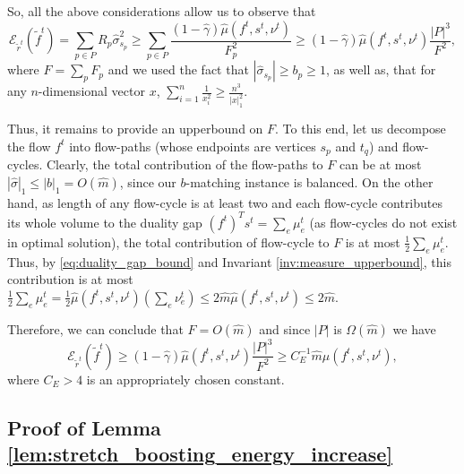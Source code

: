 \documentclass[11pt, letterpaper]{article}
\newcommand{\cenergy}{C_{E}}
\newcommand{\onorm}[1]{|#1|_{1}}
\newcommand{\hm}{\widehat{m}}
\newcommand{\energy}[2]{\mathcal{E}_{#1}(#2)}
\newcommand{\hmu}{\hat{\mu}}
\newcommand{\hgamma}{\hat{\gamma}}
\newcommand{\hsigma}{\hat{\sigma}}
\newcommand{\vnu}{\boldsymbol{\mathit{\nu}}}
\newcommand{\hvsigma}{\boldsymbol{\mathit{\hat{\sigma}}}}
\newcommand{\bb}{\boldsymbol{\mathit{b}}}
\newcommand{\ff}{\boldsymbol{\mathit{f}}}
\newcommand{\tff}{\boldsymbol{\mathit{\tilde{f}}}}
\newcommand{\trr}{\boldsymbol{\mathit{\tilde{r}}}}
\renewcommand{\ss}{\boldsymbol{\mathit{s}}}
\newcommand{\xx}{\boldsymbol{\mathit{x}}}
\begin{document}
So, all the above considerations allow us to observe that
\[
\energy{\trr^t}{\tff^t}= \sum_{p\in P} R_p \hsigma_{s_p}^2 \geq \sum_{p\in P} \frac{(1-\hgamma)\hmu(\ff^t,\ss^t,\vnu^t)}{F_p^2} \geq  (1-\hgamma)\hmu(\ff^t,\ss^t,\vnu^t) \frac{|P|^3}{F^2}, 
\]
where $F=\sum_p F_p$ and we used the fact that $|\hsigma_{s_p}|\geq b_p\geq 1$, as well as, that for any $n$-dimensional vector $\xx$, $\sum_{i=1}^n \frac{1}{x_i^2}\geq \frac{n^3}{\onorm{\xx}^2}$. 

Thus, it remains to provide an upperbound on $F$. To this end, let us decompose the flow $\ff^t$ into flow-paths (whose endpoints are vertices $s_p$ and $t_q$) and flow-cycles. Clearly, the total contribution of the flow-paths to $F$ can be at most $\onorm{\hvsigma}\leq \onorm{\bb}=O(\hm)$, since our $\bb$-matching instance is balanced. On the other hand, as length of any flow-cycle is at least two and each flow-cycle contributes its whole volume to the duality gap $(\ff^t)^T\ss^t=\sum_e \mu_e^t$ (as flow-cycles do not exist in optimal solution), the total contribution of flow-cycle to $F$ is at most $\frac{1}{2}\sum_e \mu_e^t$. Thus, by \eqref{eq:duality_gap_bound} and Invariant \ref{inv:measure_upperbound}, this contribution is at most $\frac{1}{2}\sum_e \mu_e^t=\frac{1}{2}\hmu(\ff^t,\ss^t,\vnu^t)(\sum_e \nu_e^t) \leq  2\hm \hmu(\ff^t,\ss^t,\vnu^t)\leq 2\hm$. 

Therefore, we can conclude that $F= O(\hm)$ and since $|P|$ is $\Omega(\hm)$ we have
\[
\energy{\trr^t}{\tff^t} \geq  (1-\hgamma)\hmu(\ff^t,\ss^t,\vnu^t) \frac{|P|^3}{F^2} \geq \cenergy^{-1} \hm \hmu(\ff^t,\ss^t,\vnu^t),
\]
where $\cenergy>4$ is an appropriately chosen constant.

\subsection{Proof of Lemma \ref{lem:stretch_boosting_energy_increase}}\label{app:stretch_boosting_energy_increase}
\end{document}
